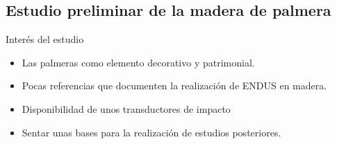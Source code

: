 \documentclass[utf8, compress]			{beamer}
\begin{document}
\subsection{Estudio preliminar de la madera de palmera}

\begin{frame}{Interés del estudio}
    \begin{itemize}
	\item Las palmeras como elemento decorativo y patrimonial.
	\item Pocas referencias que documenten la realización de ENDUS en
	    madera.
	\item Disponibilidad de unos transductores de impacto
	\item \alert{Sentar unas bases para la realización de estudios
	    posteriores.}
    \end{itemize}
\end{frame}
\end{document}
